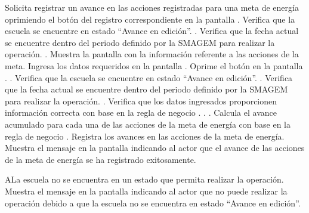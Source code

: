 \begin{UCtrayectoria}
    \UCpaso[\UCactor] Solicita registrar un avance en las acciones registradas para una meta de energía oprimiendo el botón \botAutoAjus del registro correspondiente en la pantalla .
    \UCpaso[\UCsist] Verifica que la escuela se encuentre en estado ``Avance en edición''. .
    \UCpaso[\UCsist] Verifica que la fecha actual se encuentre dentro del periodo definido por la SMAGEM para realizar la operación. .    
    \UCpaso[\UCsist] Muestra la pantalla  con la información referente a las acciones de la meta. 
    \UCpaso[\UCactor] Ingresa los datos requeridos en la pantalla . \label{cus23:RegAvanceEnergia}
    \UCpaso[\UCactor] Oprime el botón  en la pantalla . .
    \UCpaso[\UCsist] Verifica que la escuela se encuentre en estado ``Avance en edición''. .
    \UCpaso[\UCsist] Verifica que la fecha actual se encuentre dentro del periodo definido por la SMAGEM para realizar la operación. .
    \UCpaso[\UCsist] Verifica que los datos ingresados proporcionen información correcta con base en la regla de negocio .  . .    
    \UCpaso[\UCsist] Calcula el avance acumulado para cada una de las acciones de la meta de energía con base en la regla de negocio .
    \UCpaso[\UCsist] Registra los avances en las acciones de la meta de energía.
    \UCpaso[\UCsist] Muestra el mensaje  en la pantalla  indicando al actor que el avance de las acciones de la meta de energía se ha registrado exitosamente.
 \end{UCtrayectoria}
 
    
        \begin{UCtrayectoriaA}{A}{La escuela no se encuentra en un estado que permita realizar la operación.}
	\UCpaso[\UCsist] Muestra el mensaje  en la pantalla  indicando al actor que no puede realizar la operación debido a que la escuela no se encuentra en estado ``Avance en edición''. 
    \end{UCtrayectoriaA}
 
